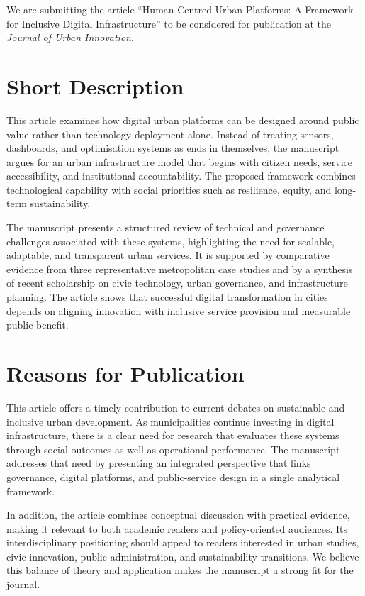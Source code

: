\documentclass{editorialcover}
\begin{document}
\makecoverletter

We are submitting the article ``Human-Centred Urban Platforms: A Framework for Inclusive Digital Infrastructure'' to be considered for publication at the \emph{Journal of Urban Innovation}.

\section{Short Description}
This article examines how digital urban platforms can be designed around public value rather than technology deployment alone. Instead of treating sensors, dashboards, and optimisation systems as ends in themselves, the manuscript argues for an urban infrastructure model that begins with citizen needs, service accessibility, and institutional accountability. The proposed framework combines technological capability with social priorities such as resilience, equity, and long-term sustainability.

The manuscript presents a structured review of technical and governance challenges associated with these systems, highlighting the need for scalable, adaptable, and transparent urban services. It is supported by comparative evidence from three representative metropolitan case studies and by a synthesis of recent scholarship on civic technology, urban governance, and infrastructure planning. The article shows that successful digital transformation in cities depends on aligning innovation with inclusive service provision and measurable public benefit.

\section{Reasons for Publication}
This article offers a timely contribution to current debates on sustainable and inclusive urban development. As municipalities continue investing in digital infrastructure, there is a clear need for research that evaluates these systems through social outcomes as well as operational performance. The manuscript addresses that need by presenting an integrated perspective that links governance, digital platforms, and public-service design in a single analytical framework.

In addition, the article combines conceptual discussion with practical evidence, making it relevant to both academic readers and policy-oriented audiences. Its interdisciplinary positioning should appeal to readers interested in urban studies, civic innovation, public administration, and sustainability transitions. We believe this balance of theory and application makes the manuscript a strong fit for the journal.
\end{document}
